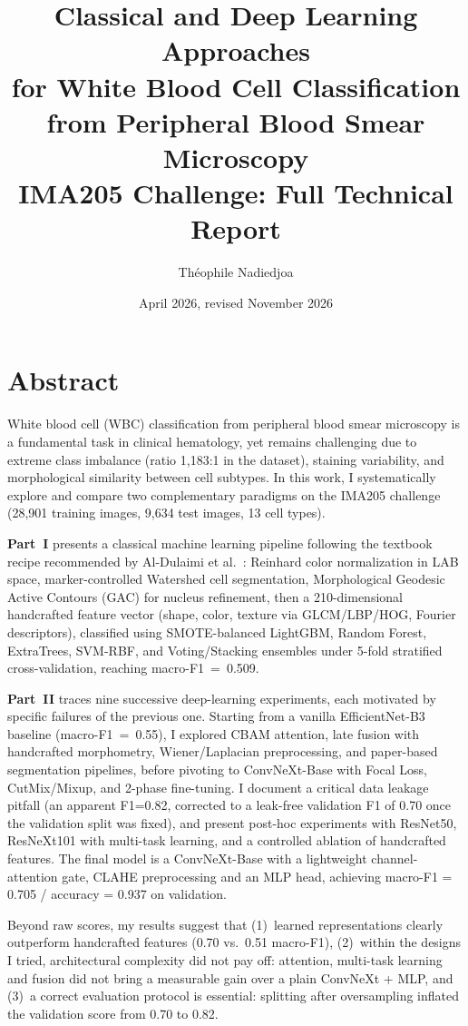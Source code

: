 \documentclass[twocolumn,a4paper]{article}
\title{Classical and Deep Learning Approaches\\for White Blood Cell Classification\\from Peripheral Blood Smear Microscopy\\[0.5em]\large IMA205 Challenge: Full Technical Report}
\author{Th\'eophile Nadiedjoa}
\date{April 2026, revised November 2026}
\begin{document}
\maketitle

\section*{Abstract}

White blood cell (WBC) classification from peripheral blood smear microscopy is a fundamental task in clinical hematology, yet remains challenging due to extreme class imbalance (ratio 1,183:1 in the dataset), staining variability, and morphological similarity between cell subtypes. In this work, I systematically explore and compare two complementary paradigms on the IMA205 challenge (28,901 training images, 9,634 test images, 13 cell types).

\textbf{Part~I} presents a classical machine learning pipeline following the textbook recipe recommended by Al-Dulaimi et al.~\cite{aldulaimi2018}: Reinhard color normalization in LAB space, marker-controlled Watershed cell segmentation, Morphological Geodesic Active Contours (GAC) for nucleus refinement, then a 210-dimensional handcrafted feature vector (shape, color, texture via GLCM/LBP/HOG, Fourier descriptors), classified using SMOTE-balanced LightGBM, Random Forest, ExtraTrees, SVM-RBF, and Voting/Stacking ensembles under 5-fold stratified cross-validation, reaching macro-F1~=~0.509.

\textbf{Part~II} traces nine successive deep-learning experiments, each motivated by specific failures of the previous one. Starting from a vanilla EfficientNet-B3 baseline (macro-F1~=~0.55), I explored CBAM attention, late fusion with handcrafted morphometry, Wiener/Laplacian preprocessing, and paper-based segmentation pipelines, before pivoting to ConvNeXt-Base with Focal Loss, CutMix/Mixup, and 2-phase fine-tuning. I document a critical data leakage pitfall (an apparent F1=0.82, corrected to a leak-free validation F1 of 0.70 once the validation split was fixed), and present post-hoc experiments with ResNet50, ResNeXt101 with multi-task learning, and a controlled ablation of handcrafted features. The final model is a ConvNeXt-Base with a lightweight channel-attention gate, CLAHE preprocessing and an MLP head, achieving macro-F1 = 0.705 / accuracy = 0.937 on validation.

Beyond raw scores, my results suggest that (1)~learned representations clearly outperform handcrafted features (0.70 vs.\ 0.51 macro-F1), (2)~within the designs I tried, architectural complexity did not pay off: attention, multi-task learning and fusion did not bring a measurable gain over a plain ConvNeXt + MLP, and (3)~a correct evaluation protocol is essential: splitting after oversampling inflated the validation score from 0.70 to 0.82.
\end{document}
